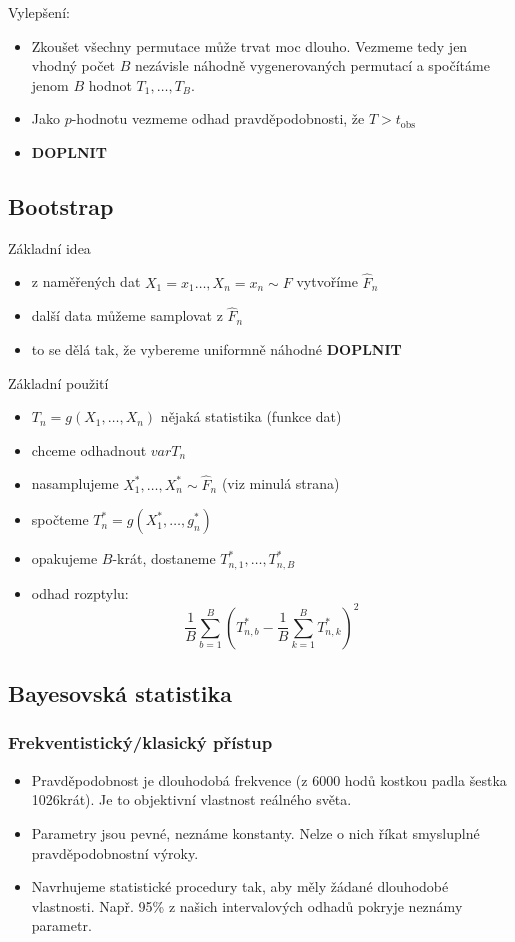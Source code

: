 \documentclass[../main.tex]{subfiles}
\begin{document}
\begin{example}
\begin{itemize}
    \end{itemize}
    Vylepšení:
    \begin{itemize}
        \item Zkoušet všechny permutace může trvat moc dlouho. Vezmeme tedy jen vhodný počet $B$ nezávisle náhodně vygenerovaných permutací a spočítáme jenom
        $B$ hodnot $T_1,\dots,T_B$.
        \item Jako $p$-hodnotu vezmeme odhad pravděpodobnosti, že $T > t_{\text{obs}}$
        \item \textbf{DOPLNIT} 
    \end{itemize}
\end{example}
\subsection{Bootstrap}
\begin{example}
    Základní idea
    \begin{itemize}
        \item z naměřených dat $X_1 = x_1 \dots,X_n = x_n \sim F$ vytvoříme $\widehat{F}_n$
        \item další data můžeme samplovat z $\widehat{F}_n$
        \item to se dělá tak, že vybereme uniformně náhodné \textbf{DOPLNIT}
    \end{itemize}
    Základní použití
    \begin{itemize}
        \item $T_n = g(X_1,\dots,X_n)$ nějaká statistika (funkce dat)
        \item chceme odhadnout $var T_n$
        \item nasamplujeme $X^*_1,\dots,X^*_n \sim \widehat{F}_n$ (viz minulá strana)
        \item spočteme $T^*_n = g(X^*_1,\dots,g^*_n)$
        \item opakujeme $B$-krát, dostaneme $T^*_{n,1},\dots,T^*_{n,B}$
        \item odhad rozptylu:
        \[\frac{1}{B}\sum^{B}_{b=1}\left(T^*_{n,b}-\frac{1}{B}\sum^{B}_{k=1}T^*_{n,k}\right)^2\]
    \end{itemize}
\end{example}
\subsection{Bayesovská statistika}
\subsubsection{Frekventistický/klasický přístup}
\begin{itemize}
    \item Pravděpodobnost je dlouhodobá frekvence (z 6000 hodů kostkou padla šestka 1026krát). Je to objektivní vlastnost reálného světa.
    \item Parametry jsou pevné, neznáme konstanty. Nelze o nich říkat smysluplné pravděpodobnostní výroky.
    \item Navrhujeme statistické procedury tak, aby měly žádané dlouhodobé vlastnosti. Např. 95\% z našich intervalových odhadů pokryje neznámy parametr.
\end{itemize}
\end{document}

